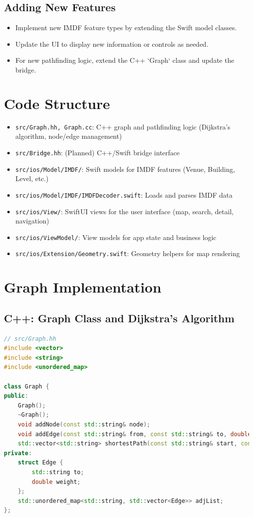 \documentclass{article}
\begin{document}
\subsection{Adding New Features}
\begin{itemize}
    \item Implement new IMDF feature types by extending the Swift model classes.
    \item Update the UI to display new information or controls as needed.
    \item For new pathfinding logic, extend the C++ `Graph` class and update the bridge.
\end{itemize}

\section{Code Structure}
\begin{itemize}
    \item \texttt{src/Graph.hh, Graph.cc}: C++ graph and pathfinding logic (Dijkstra's algorithm, node/edge management)
    \item \texttt{src/Bridge.hh}: (Planned) C++/Swift bridge interface
    \item \texttt{src/ios/Model/IMDF/}: Swift models for IMDF features (Venue, Building, Level, etc.)
    \item \texttt{src/ios/Model/IMDF/IMDFDecoder.swift}: Loads and parses IMDF data
    \item \texttt{src/ios/View/}: SwiftUI views for the user interface (map, search, detail, navigation)
    \item \texttt{src/ios/ViewModel/}: View models for app state and business logic
    \item \texttt{src/ios/Extension/Geometry.swift}: Geometry helpers for map rendering
\end{itemize}

\section{Graph Implementation}

\subsection{C++: Graph Class and Dijkstra's Algorithm}
\begin{lstlisting}[language=cpp]
// src/Graph.hh
#include <vector>
#include <string>
#include <unordered_map>

class Graph {
public:
    Graph();
    ~Graph();
    void addNode(const std::string& node);
    void addEdge(const std::string& from, const std::string& to, double weight);
    std::vector<std::string> shortestPath(const std::string& start, const std::string& end);
private:
    struct Edge {
        std::string to;
        double weight;
    };
    std::unordered_map<std::string, std::vector<Edge>> adjList;
};
\end{lstlisting}
\end{document}
